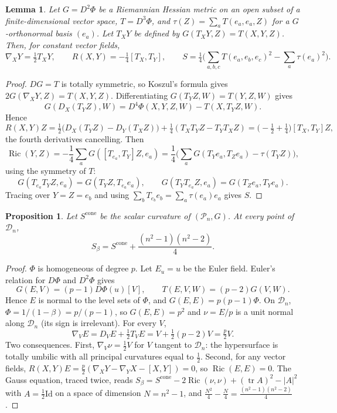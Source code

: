 \documentclass[11pt]{amsart}
\newtheorem{proposition}[theorem]{Proposition}
\newtheorem{lemma}[theorem]{Lemma}
\theoremstyle{definition}
\numberwithin{equation}{section}
\newcommand{\Pn}{\mathcal{P}_n}
\newcommand{\Dn}{\mathcal{D}_n}
\newcommand{\tr}{\operatorname{tr}}
\newcommand{\Ric}{\operatorname{Ric}}
\begin{document}
\begin{lemma}\label{lem:hesscurv}
Let $G=D^2\Phi$ be a Riemannian Hessian metric on an open subset of a finite-dimensional vector space, $T=D^3\Phi$, and $\tau(Z)=\sum_aT(e_a,e_a,Z)$ for a $G$-orthonormal
basis $(e_a)$. Let $T_XY$ be defined by $G(T_XY,Z)=T(X,Y,Z)$. Then, for constant vector fields,
\begin{equation*}
\nabla_XY=\tfrac12T_XY,\qquad R(X,Y)=-\tfrac14[T_X,T_Y],\qquad S=\tfrac14\Big(\sum_{a,b,c}T(e_a,e_b,e_c)^2-\sum_a\tau(e_a)^2\Big).
\end{equation*}
\end{lemma}
\begin{proof}
$DG=T$ is totally symmetric, so Koszul's formula gives $2G(\nabla_XY,Z)=T(X,Y,Z)$. Differentiating $G(T_YZ,W)=T(Y,Z,W)$ gives
\[G(D_X(T_YZ),W)=D^4\Phi(X,Y,Z,W)-T(X,T_YZ,W).\]
Hence
\[R(X,Y)Z=\tfrac12\big(D_X(T_YZ)-D_Y(T_XZ)\big)+\tfrac14(T_XT_YZ-T_YT_XZ)=\big(-\tfrac12+\tfrac14\big)[T_X,T_Y]Z ,\]
the fourth derivatives cancelling. Then
\[\Ric(Y,Z)=-\frac14\sum_aG([T_{e_a},T_Y]Z,e_a)=\frac14\Big(\sum_aG(T_Ye_a,T_Ze_a)-\tau(T_YZ)\Big),\]
using the symmetry of $T$:
\[G(T_{e_a}T_YZ,e_a)=G(T_YZ,T_{e_a}e_a),\qquad G(T_YT_{e_a}Z,e_a)=G(T_Ze_a,T_Ye_a).\]
 Tracing over $Y=Z=e_b$ and using $\sum_bT_{e_b}e_b=\sum_a\tau(e_a)e_a$ gives $S$.
\end{proof}

\begin{proposition}\label{prop:gauss}
Let $S^{\mathrm{cone}}$ be the scalar curvature of $(\Pn,G)$. At every point of $\Dn$,
\[S_\beta=S^{\mathrm{cone}}+\frac{(n^2-1)(n^2-2)}{4}.\]
\end{proposition}
\begin{proof}
$\Phi$ is homogeneous of degree $p$. Let $E_u=u$ be the Euler field. Euler's relation for $D\Phi$ and $D^2\Phi$ gives
\[G(E,V)=(p-1)D\Phi(u)[V],\qquad T(E,V,W)=(p-2)G(V,W).\]
Hence $E$ is normal to the level sets of $\Phi$, and $G(E,E)=p(p-1)\Phi$. On $\Dn$, $\Phi=1/(1-\beta)=p/(p-1)$, so $G(E,E)=p^2$ and $\nu=E/p$ is a unit normal
along $\Dn$ (its sign is irrelevant). For every $V$,
\[\nabla_VE=D_VE+\tfrac12T_VE=V+\tfrac12(p-2)V=\tfrac p2V .\]
Two consequences. First, $\nabla_V\nu=\frac12V$ for $V$ tangent to $\Dn$: the hypersurface is totally umbilic with all principal curvatures equal to
$\frac12$. Second, for any vector fields, $R(X,Y)E=\frac p2(\nabla_XY-\nabla_YX-[X,Y])=0$, so $\Ric(E,E)=0$. The Gauss equation, traced twice, reads
$S_\beta=S^{\mathrm{cone}}-2\Ric(\nu,\nu)+(\tr A)^2-|A|^2$ with $A=\frac12\mathrm{Id}$ on a space of dimension $N=n^2-1$, and $\frac{N^2}4-\frac N4=\frac{(n^2-1)(n^2-2)}4$.
\end{proof}
\end{document}
